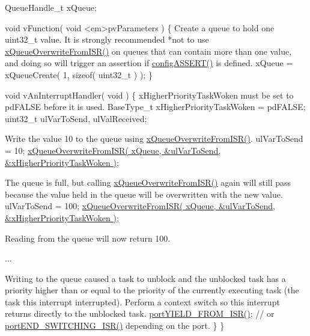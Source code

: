 \begin{DoxyPre} QueueHandle\_t xQueue;\end{DoxyPre}



\begin{DoxyPre} void vFunction( void <em>pvParameters )
 \{
Create a queue to hold one uint32\_t value.  It is strongly
recommended *not to use \hyperlink{queue_8h_abdcd6a86ef82034d002193e79cfd3ce8}{xQueueOverwriteFromISR()} on queues that can
contain more than one value, and doing so will trigger an assertion
if \hyperlink{FreeRTOSConfig_8h_a228c70cd48927d6ab730ed1a6dfbe35f}{configASSERT()} is defined.
    xQueue = xQueueCreate( 1, sizeof( uint32\_t ) );
\}\end{DoxyPre}



\begin{DoxyPre}void vAnInterruptHandler( void )
\{
xHigherPriorityTaskWoken must be set to pdFALSE before it is used.
BaseType\_t xHigherPriorityTaskWoken = pdFALSE;
uint32\_t ulVarToSend, ulValReceived;\end{DoxyPre}



\begin{DoxyPre}Write the value 10 to the queue using \hyperlink{queue_8h_abdcd6a86ef82034d002193e79cfd3ce8}{xQueueOverwriteFromISR()}.
    ulVarToSend = 10;
    \hyperlink{queue_8h_abdcd6a86ef82034d002193e79cfd3ce8}{xQueueOverwriteFromISR( xQueue, &ulVarToSend, &xHigherPriorityTaskWoken )};\end{DoxyPre}



\begin{DoxyPre}The queue is full, but calling \hyperlink{queue_8h_abdcd6a86ef82034d002193e79cfd3ce8}{xQueueOverwriteFromISR()} again will still
pass because the value held in the queue will be overwritten with the
new value.
    ulVarToSend = 100;
    \hyperlink{queue_8h_abdcd6a86ef82034d002193e79cfd3ce8}{xQueueOverwriteFromISR( xQueue, &ulVarToSend, &xHigherPriorityTaskWoken )};\end{DoxyPre}



\begin{DoxyPre}Reading from the queue will now return 100.\end{DoxyPre}



\begin{DoxyPre}...
\begin{DoxyVerb}if( xHigherPrioritytaskWoken == pdTRUE )
{
\end{DoxyVerb}

Writing to the queue caused a task to unblock and the unblocked task
has a priority higher than or equal to the priority of the currently
executing task (the task this interrupt interrupted).  Perform a context
switch so this interrupt returns directly to the unblocked task.
        \hyperlink{CCS_2ARM__CM4F_2portmacro_8h_aac6850c66595efdc02a8bbb95fb4648e}{portYIELD\_FROM\_ISR()}; // or \hyperlink{CCS_2ARM__CM4F_2portmacro_8h_a63b994040c62c9685490a71c87a13d8a}{portEND\_SWITCHING\_ISR()} depending on the port.
    \}
\}
 \end{DoxyPre}
 
